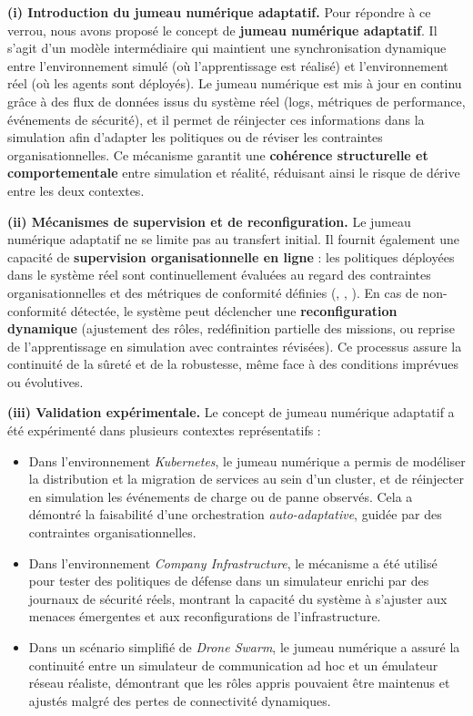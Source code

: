\medskip
\noindent
\textbf{(i) Introduction du jumeau numérique adaptatif.}
Pour répondre à ce verrou, nous avons proposé le concept de \textbf{jumeau numérique adaptatif}.
Il s'agit d'un modèle intermédiaire qui maintient une synchronisation dynamique entre l'environnement simulé (où l'apprentissage est réalisé) et l'environnement réel (où les agents sont déployés).
Le jumeau numérique est mis à jour en continu grâce à des flux de données issus du système réel (logs, métriques de performance, événements de sécurité), et il permet de réinjecter ces informations dans la simulation afin d'adapter les politiques ou de réviser les contraintes organisationnelles.
Ce mécanisme garantit une \textbf{cohérence structurelle et comportementale} entre simulation et réalité, réduisant ainsi le risque de dérive entre les deux contextes.

\medskip
\noindent
\textbf{(ii) Mécanismes de supervision et de reconfiguration.}
Le jumeau numérique adaptatif ne se limite pas au transfert initial.
Il fournit également une capacité de \textbf{supervision organisationnelle en ligne} :
les politiques déployées dans le système réel sont continuellement évaluées au regard des contraintes organisationnelles et des métriques de conformité définies (, , ).
En cas de non-conformité détectée, le système peut déclencher une \textbf{reconfiguration dynamique} (ajustement des rôles, redéfinition partielle des missions, ou reprise de l'apprentissage en simulation avec contraintes révisées).
Ce processus assure la continuité de la sûreté et de la robustesse, même face à des conditions imprévues ou évolutives.

\medskip
\noindent
\textbf{(iii) Validation expérimentale.}
Le concept de jumeau numérique adaptatif a été expérimenté dans plusieurs contextes représentatifs :
\begin{itemize}
  \item Dans l'environnement \textit{Kubernetes}, le jumeau numérique a permis de modéliser la distribution et la migration de services au sein d'un cluster, et de réinjecter en simulation les événements de charge ou de panne observés. Cela a démontré la faisabilité d'une orchestration \textit{auto-adaptative}, guidée par des contraintes organisationnelles.
  \item Dans l'environnement \textit{Company Infrastructure}, le mécanisme a été utilisé pour tester des politiques de défense dans un simulateur enrichi par des journaux de sécurité réels, montrant la capacité du système à s'ajuster aux menaces émergentes et aux reconfigurations de l'infrastructure.
  \item Dans un scénario simplifié de \textit{Drone Swarm}, le jumeau numérique a assuré la continuité entre un simulateur de communication ad hoc et un émulateur réseau réaliste, démontrant que les rôles appris pouvaient être maintenus et ajustés malgré des pertes de connectivité dynamiques.
\end{itemize}

